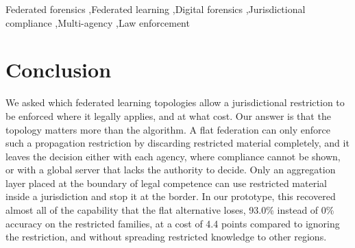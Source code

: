 \documentclass[final,5p,times,twocolumn,authoryear]{elsarticle}
\begin{document}
\begin{frontmatter}
\begin{abstract}
Digital forensic investigations increasingly cross borders, and law enforcement agencies need to build analytical models together without centralizing their data. Federated Learning (FL) keeps data local, yet neither FL nor its frameworks enforce the jurisdictional, governance, and accountability rules that multi-agency forensic work requires.
%
This paper takes a design-first approach to that gap. First, we derive seven requirements that a federated learning system must meet in a forensic setting.  
Second, we propose \emph{Federated Forensics}, a three-layer reference architecture whose middle layer, unlike in existing hierarchical FL designs, sits at a jurisdictional border and can use a model update locally while blocking it from crossing that border. Third, we build a prototype of the architecture and test it on a malware-family classification task.
%
In a prototype evaluation, the policy gate blocked every restricted update at the border with zero violations, and restricted-class accuracy rose from 0\% under today's compliant alternative to 93.0\%, only 4.4 points below ignoring the restriction.


\end{abstract}



\begin{keyword}
Federated forensics \sep Federated learning \sep Digital forensics \sep Jurisdictional compliance  \sep Multi-agency  \sep Law enforcement
\end{keyword}



\end{frontmatter}













\section{Conclusion}
\label{sec:conclusion}
We asked which federated learning topologies allow a jurisdictional restriction to be enforced where it legally applies, and at what cost. Our answer is that the topology matters more than the algorithm. A flat federation can only enforce such a propagation restriction by discarding restricted material completely, and it leaves the decision either with each agency, where compliance cannot be shown, or with a global server that lacks the authority to decide. Only an aggregation layer placed at the boundary of legal competence can use restricted material inside a jurisdiction and stop it at the border. In our prototype, this recovered almost all of the capability that the flat alternative loses, 93.0\% instead of 0\% accuracy on the restricted families, at a cost of 4.4 points compared to ignoring the restriction, and without spreading restricted knowledge to other regions.
\end{document}
